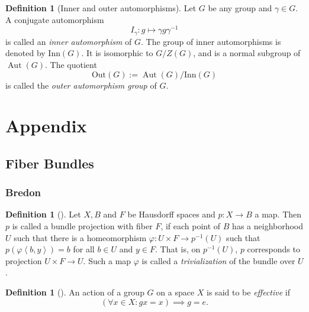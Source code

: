 \documentclass[reqno]{amsart}
\theoremstyle{definition}
\newtheorem{definition}[theorem]{Definition}
\theoremstyle{remark}
\DeclareMathOperator{\Aut}{Aut}
\begin{document}
\begin{definition}[Inner and outer automorphisms]
    Let $G$ be any group and $\gamma \in G$. A conjugate
    automorphism 
    \[
    I_{\gamma} \colon g \mapsto \gamma g \gamma^{-1}
    \] 
    is called an \textit{inner automorphism} of $G$.
    The group of inner automorphisms is denoted
    by $\text{Inn}(G)$. It is isomorphic to
    $G / Z(G)$, and is a normal subgroup of
    $\Aut(G)$. The quotient
    \[
    \text{Out}(G) := \Aut(G) / \text{Inn}(G)
    \] 
    is called the \textit{outer automorphism group} of
    $G$.
\end{definition}

\section{Appendix}

\subsection{Fiber Bundles}

\subsubsection{Bredon}

\begin{definition}[]
    Let $X, B$ and $F$ be Hausdorff spaces and
    $p \colon X \to B$ a map.
    Then $p$ is called a bundle projection with
    fiber $F$, if each point of
    $B$ has a neighborhood $U$ such that there
    is a homeomorphism $\varphi \colon U \times F \to 
    p^{-1}(U) $ such that $p \left( \varphi
    \left<b,y  \right>\right) = b$ for all $b \in U$ and
    $y \in F$. That is, on  $p^{-1}(U)$, $p$ corresponds
    to projection $U \times F \to U$. Such a map
    $\varphi $ is called a \textit{trivialization} of the
    bundle over $U$.
\end{definition}

\begin{definition}[]
    An action of a group $G$ on a space $X$ is
    said to be \textit{effective} if
    \[
        \left( \forall x \in X \colon
        gx = x \right) \implies g = e.
    \] 
\end{definition}
\end{document}
